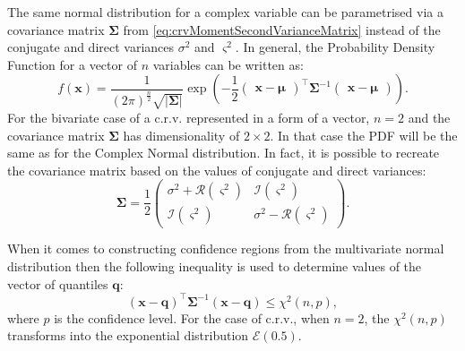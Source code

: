 \documentclass[
]{book}
\begin{document}
The same normal distribution for a complex variable can be parametrised via a covariance matrix \(\boldsymbol{\Sigma}\) from \eqref{eq:crvMomentSecondVarianceMatrix} instead of the conjugate and direct variances \(\sigma^2\) and \(\varsigma^2\). In general, the Probability Density Function for a vector of \(n\) variables can be written as:
\begin{equation}
    f(\mathbf{x}) = \frac{1}{(2 \pi)^{\frac{n}{2}} \sqrt{|\boldsymbol{\Sigma}|}} \exp\left(- \frac{1}{2}
        \begin{pmatrix} \mathbf{x} - \boldsymbol{\mu} \end{pmatrix}^\top \boldsymbol{\Sigma}^{-1} \begin{pmatrix} \mathbf{x} - \boldsymbol{\mu} \end{pmatrix}
    \right).
    \label{eq:MultivariateNormalPDF}
\end{equation}
For the bivariate case of a c.r.v. represented in a form of a vector, \(n=2\) and the covariance matrix \(\boldsymbol{\Sigma}\) has dimensionality of \(2 \times 2\). In that case the PDF will be the same as for the Complex Normal distribution. In fact, it is possible to recreate the covariance matrix based on the values of conjugate and direct variances:
\begin{equation}
    \boldsymbol{\Sigma} = \frac{1}{2} \begin{pmatrix} \sigma^2 + \mathcal{R}(\varsigma^2) & \mathcal{I}(\varsigma^2) \\
                                                      \mathcal{I}(\varsigma^2) & \sigma^2 - \mathcal{R}(\varsigma^2) \end{pmatrix} .
    \label{eq:MultivariateNormalPDFCovariance}
\end{equation}

When it comes to constructing confidence regions from the multivariate normal distribution then the following inequality is used to determine values of the vector of quantiles \(\mathbf{q}\):
\begin{equation}
    (\mathbf{x} - \mathbf{q})^{\top} \mathbf{\Sigma}^{-1} (\mathbf{x} - \mathbf{q}) \leq \chi^2(n, p) ,
    \label{eq:MultivariateNormalRegion}
\end{equation}
where \(p\) is the confidence level. For the case of c.r.v., when \(n=2\), the \(\chi^2(n, p)\) transforms into the exponential distribution \(\mathcal{E}(0.5)\).
\end{document}
